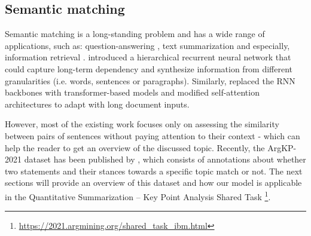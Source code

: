 \subsection{Semantic matching} 

Semantic matching is a long-standing problem and has a wide range of applications, such as: question-answering \citep{yang-etal-2015-wikiqa}, text summarization \citep{zhong-etal-2020-extractive} and especially, information retrieval \citep{huang2013learning, guo2016deep}. \citet{jiang2019semantic} introduced a hierarchical recurrent neural network that could capture long-term dependency and synthesize information from different granularities (i.e. words, sentences or paragraphs). Similarly, \citet{yang2020beyond} replaced the RNN backbones with transformer-based models and modified self-attention architectures to adapt with long document inputs. 

However, most of the existing work focuses only on assessing the similarity between pairs of sentences without paying attention to their context - which can help the reader to get an overview of the discussed topic. Recently, the ArgKP-2021 dataset has been published by \citet{bar-haim-etal-2020-arguments}, which consists of annotations about whether two statements and their stances towards a specific topic match or not. The next sections will provide an overview of this dataset and how our model is applicable in the Quantitative Summarization – Key Point Analysis Shared Task \footnote{\url{https://2021.argmining.org/shared_task_ibm.html}}.